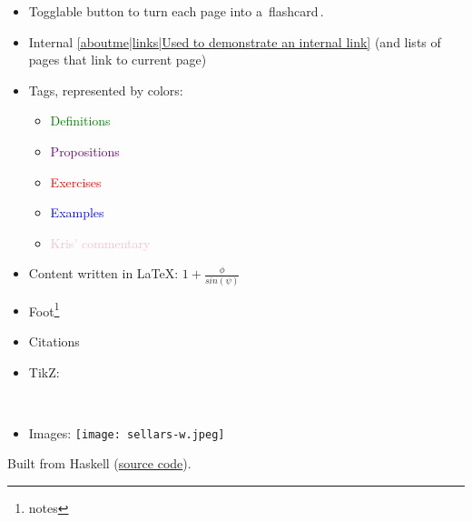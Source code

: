 \begin{itemize}
\item Togglable button to turn each page into a \,flashcard\,.
\item Internal \ref{aboutme|links|Used to demonstrate an internal link} (and lists of pages that link to current page)
\item Tags, represented by colors: \begin{itemize}
	\item \textcolor{green}{Definitions}
	\item \textcolor{purple}{Propositions}
	\item \textcolor{red}{Exercises}
	\item \textcolor{blue}{Examples}
	\item \textcolor{pink}{Kris' commentary}
	\end{itemize}
\item Content written in \LaTeX: $1+\frac{\phi}{sin(\psi)}$
\item Foot\footnote{notes}
\item Citations \cite{mazieres2005get}
\item TikZ: \
\item Images: \texttt{[image: sellars-w.jpeg]}

\end{itemize}

Built from Haskell (\href{https://github.com/kris-brown/KBKB}{source code}).
